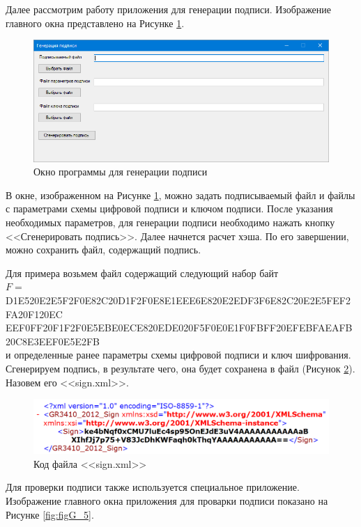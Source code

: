\par
Далее рассмотрим работу приложения для генерации подписи. Изображение главного окна представлено на Рисунке \ref*{fig:figG_3}.
\begin{figure}[H]
	\centering
	\includegraphics[width=1.0\linewidth]{inc/img/g3}
	\caption{Окно программы для генерации подписи}
	\label{fig:figG_3}
\end{figure}
\par
В окне, изображенном на Рисунке \ref{fig:figG_3}, можно задать подписываемый файл и файлы с параметрами схемы цифровой подписи и ключом подписи. После указания необходимых параметров, для генерации подписи необходимо нажать кнопку <<Сгенерировать подпись>>. Далее начнется расчет хэша. По его завершении, можно сохранить файл, содержащий подпись.
\par
Для примера возьмем файл содержащий следующий набор байт\\
{\ttfamily
$F=\;$D1E520E2E5F2F0E82C20D1F2F0E8E1EEE6E820E2EDF3F6E82C20E2E5FEF2FA20F120EC\\EEF0FF20F1F2F0E5EBE0ECE820EDE020F5F0E0E1F0FBFF20EFEBFAEAFB20C8E3EEF0E5E2FB\\
}
и определенные ранее параметры схемы цифровой подписи и ключ шифрования. Сгенерируем подпись, в результате чего, она будет сохранена в файл (Рисунок \ref{fig:figG_4}). Назовем его <<sign.xml>>.
\begin{figure}[H]
	\centering
	\includegraphics[width=0.9\linewidth]{inc/img/g4}
	\caption{Код файла <<sign.xml>>}
	\label{fig:figG_4}
\end{figure}
\par
Для проверки подписи также используется специальное приложение. Изображение главного окна приложения для проварки подписи показано на Рисунке \ref{fig:figG_5}.
